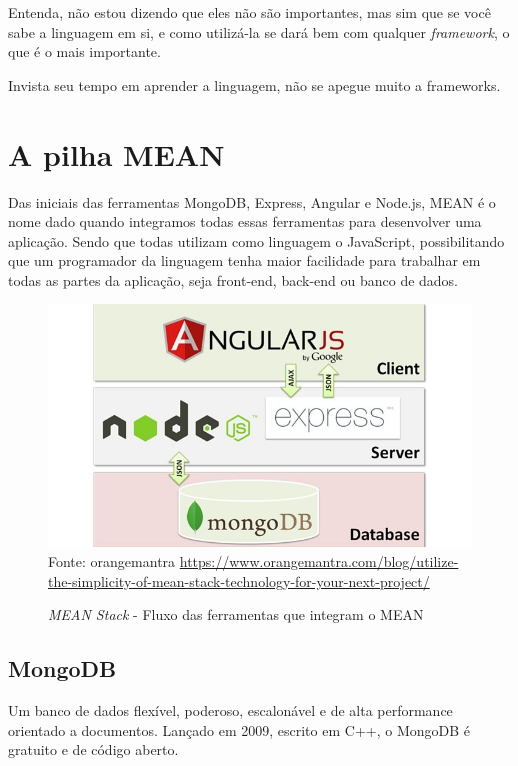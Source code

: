\documentclass[
	12pt,				%
	openright,			%
	twoside,			%
	a4paper,			%
	english,			%
	brazil				%
	]{abntex2}
\begin{document}
Entenda, não estou dizendo que eles não são importantes, mas sim que se você sabe a linguagem em si, e como utilizá-la se dará bem com qualquer \textit{framework}, o que é o mais importante.

Invista seu tempo em aprender a linguagem, não se apegue muito a frameworks. 
\chapter{A pilha MEAN}

Das iniciais das ferramentas MongoDB, Express, Angular e Node.js, MEAN é o nome dado quando integramos todas essas ferramentas para desenvolver uma aplicação. Sendo que todas utilizam como linguagem o JavaScript, possibilitando que um programador da linguagem tenha maior facilidade para trabalhar em todas as partes da aplicação, seja front-end, back-end ou banco de dados.

\begin{figure}[h]
	\centering

	\caption{\textit{MEAN Stack} - Fluxo das ferramentas que integram o MEAN} \label{fig:MEANStackFlow}
    \includegraphics[scale=0.5]{mean-stack-flow} \\
    Fonte: {orangemantra \url{https://www.orangemantra.com/blog/utilize-the-simplicity-of-mean-stack-technology-for-your-next-project/}}

\end{figure}

\section{MongoDB}

Um banco de dados flexível, poderoso, escalonável e de alta performance orientado a documentos. Lançado em 2009, escrito em C++, o MongoDB é gratuito e de código aberto.
\end{document}
